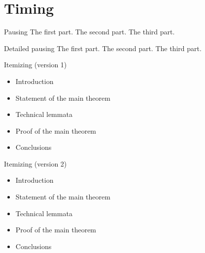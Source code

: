 \documentclass[leqno]{beamer}
\begin{document}
\section{Timing}

\begin{frame}{Pausing} 
 The first part.
 \pause
 The second part.
 \pause
  The third part.
\end{frame} 

\begin{frame}{Detailed pausing} 
 The first part.
 \pause
 The second part.
 \pause
  The third part.
\end{frame} 

\begin{frame}{Itemizing (version 1)} 
 
\begin{itemize} 
  \item Introduction 
  \pause 
  \item Statement of the main theorem 
  \pause 
  \item Technical lemmata 
  \pause 
  \item Proof of the main theorem 
  \pause 
  \item Conclusions 
\end{itemize} 
 
\end{frame} 

\begin{frame}{Itemizing (version 2)} 
 
\begin{itemize}[<+->]
  \item Introduction 
  \item Statement of the main theorem 
  \item Technical lemmata 
  \item Proof of the main theorem 
  \item Conclusions 
\end{itemize} 
 
\end{frame} 
\end{document}
